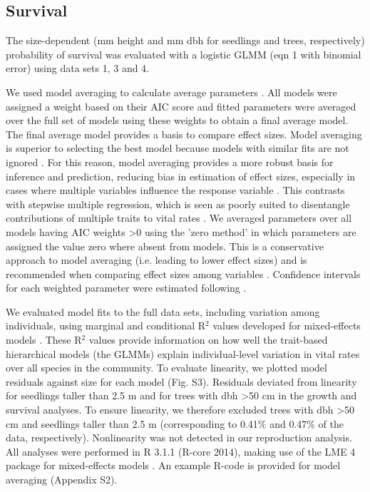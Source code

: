 \documentclass[b5paper,justified]{tufte-book} %
\begin{document}
\begin{fullwidth}
\subsection{Survival}
The size-dependent (mm height and mm dbh for seedlings and trees, respectively) probability of survival was evaluated with a logistic GLMM (eqn 1 with binomial error) using data sets 1, 3 and 4.

\vspace*{.5cm}\hspace*{.4cm} We used model averaging to calculate average parameters \citep{Burnham2002}. All models were assigned a weight based on their AIC score and fitted parameters were averaged over the full set of models using these weights to obtain a final average model. The final average model provides a basis to compare effect sizes. Model averaging is superior to selecting the best model because models with similar fits are not ignored \citep{Burnham2002, Whittingham2006, Bolker2009}. For this reason, model averaging provides a more robust basis for inference and prediction, reducing bias in estimation of effect sizes, especially in cases where multiple variables influence the response variable \citep{Grueber2011}. This contrasts with stepwise multiple regression, which is seen as poorly suited to disentangle contributions of multiple traits to vital rates \citep{Whittingham2006}. We averaged parameters over all models having AIC weights >0
using the 'zero method' in which parameters are assigned the value zero where absent from models. This is a conservative approach to model averaging (i.e. leading to lower effect sizes) and is recommended when comparing effect sizes among variables \citep{Burnham2002, Grueber2011}. Confidence intervals for each weighted parameter were estimated following \citet{Buckland1997}.

We evaluated model fits to the full data sets, including variation among individuals, using marginal and conditional R$^2$ values developed for mixed-effects models \citep{Nakagawa2013}. These R$^2$ values provide information on how well the trait-based hierarchical models (the GLMMs) explain individual-level variation in vital rates over all species in the community. To evaluate linearity, we plotted model residuals against size for each model (Fig. S3). Residuals deviated from linearity for seedlings taller than 2.5 m and for trees with dbh >50 cm in the growth and survival analyses. To ensure linearity, we therefore excluded trees with dbh >50 cm and seedlings taller than 2.5 m
(corresponding to 0.41\% and 0.47\% of the data, respectively). Nonlinearity was not detected in our reproduction analysis. All analyses were performed in R 3.1.1 (R-core 2014), making use of the LME 4 package for mixed-effects models \citep{Bates2014}. An example R-code is provided for model averaging (Appendix S2).



\end{fullwidth}
\end{document}
